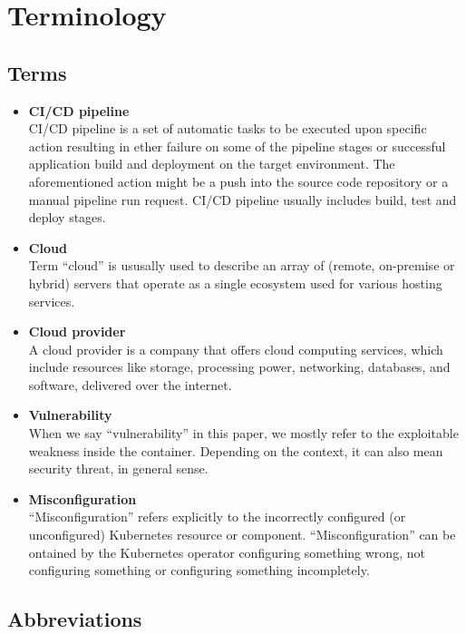 \chapter*{Terminology}

\section*{Terms}

\begin{itemize}
    \setlength\itemsep{1px}
    \item \textbf{CI/CD pipeline} \\
    CI/CD pipeline is a set of automatic tasks to be executed upon specific action resulting in ether failure on some of the pipeline stages or successful application build and deployment on the target environment. The aforementioned action might be a push into the source code repository or a manual pipeline run request. CI/CD pipeline usually includes build, test and deploy stages.
    \item \textbf{Cloud} \\
    Term ``cloud'' is ususally used to describe an array of (remote, on-premise or hybrid) servers that operate as a single ecosystem used for various hosting services.
    \item \textbf{Cloud provider} \\
    A cloud provider is a company that offers cloud computing services, which include resources like storage, processing power, networking, databases, and software, delivered over the internet.
    \item \textbf{Vulnerability} \\
    When we say ``vulnerability'' in this paper, we mostly refer to the exploitable weakness inside the container. Depending on the context, it can also mean security threat, in general sense.
    \item \textbf{Misconfiguration} \\
    ``Misconfiguration'' refers explicitly to the incorrectly configured (or unconfigured) Kubernetes resource or component. ``Misconfiguration'' can be ontained by the Kubernetes operator configuring something wrong, not configuring something or configuring something incompletely.
\end{itemize}

\section*{Abbreviations}

